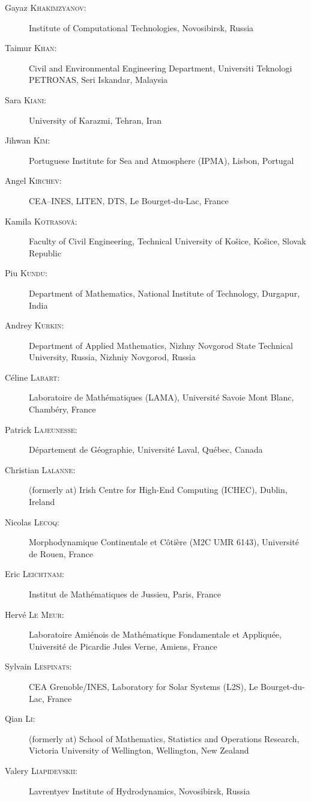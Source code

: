 \documentclass[final, a4paper, oneside, 12pt]{article}
\numberwithin{equation}{section}
\begin{document}
\begin{description}
  \item[Gayaz \textsc{Khakimzyanov}:] Institute of Computational Technologies, Novosibirsk, Russia
  \item[Taimur \textsc{Khan}:] Civil and Environmental Engineering Department, Universiti Teknologi PETRONAS, Seri Iskandar, Malaysia
  \item[Sara \textsc{Kiani}:] University of Karazmi, Tehran, Iran
  \item[Jihwan \textsc{Kim}:] Portuguese Institute for Sea and Atmosphere (IPMA), Lisbon, Portugal 
  \item[Angel \textsc{Kirchev}:] CEA--INES, LITEN, DTS, Le Bourget-du-Lac, France
  \item[Kamila \textsc{Kotrasová}:] Faculty of Civil Engineering, Technical University of Košice, Košice, Slovak Republic
  \item[Piu \textsc{Kundu}:] Department of Mathematics, National Institute of Technology, Durgapur, India
  \item[Andrey \textsc{Kurkin}:] Department of Applied Mathematics, Nizhny Novgorod State Technical University, Russia, Nizhniy Novgorod, Russia
  \item[C\'eline \textsc{Labart}:] Laboratoire de Math\'ematiques (LAMA), Universit\'e Savoie Mont Blanc, Chamb\'ery, France
  \item[Patrick \textsc{Lajeunesse}:] D\'epartement de G\'eographie, Universit\'e Laval, Qu\'ebec, Canada
  \item[Christian \textsc{Lalanne}:] (formerly at) Irish Centre for High-End Computing (ICHEC), Dublin, Ireland
  \item[Nicolas \textsc{Lecoq}:] Morphodynamique Continentale et C\^oti\`ere (M2C UMR 6143), Universit\'e de Rouen, France
  \item[Eric \textsc{Leichtnam}:] Institut de Math\'ematiques de Jussieu, Paris, France
  \item[Herv\'e \textsc{Le Meur}:] Laboratoire Ami\'enois de Math\'ematique Fondamentale et Appliqu\'ee, Universit\'e de Picardie Jules Verne, Amiens, France
  \item[Sylvain \textsc{Lespinats}:] CEA Grenoble/INES, Laboratory for Solar Systems (L2S), Le Bourget-du-Lac, France
  \item[Qian \textsc{Li}:] (formerly at) School of Mathematics, Statistics and Operations Research, Victoria University of Wellington, Wellington, New Zealand
  \item[Valery \textsc{Liapidevskii}:] Lavrentyev Institute of Hydrodynamics, Novosibirsk, Russia

\end{description}
\end{document}
